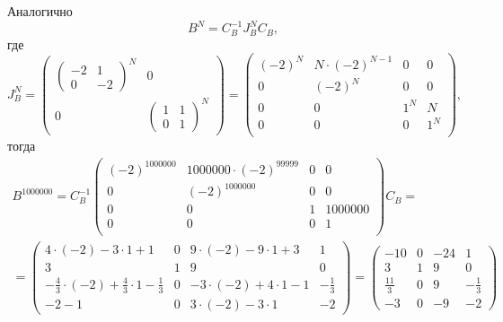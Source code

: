\documentclass[12pt]{article}
\begin{document}
    Аналогично
    \[
        B^N = C_B^{-1} J_B^N C_B ,
    \]
    где
    \[
        J_B^N
        = \begin{pmatrix}
              \begin{pmatrix}
                  -2 & 1  \\
                  0  & -2
              \end{pmatrix}^N & 0 \\
              0 & \begin{pmatrix}
                      1 & 1 \\
                      0 & 1
              \end{pmatrix}^N
        \end{pmatrix}
        =
        \begin{pmatrix}
        (-2)
            ^N & N \cdot (-2)^{N-1} & 0   & 0   \\
            0  & (-2)^N             & 0   & 0   \\
            0  & 0                  & 1^N & N   \\
            0  & 0                  & 0   & 1^N \\
        \end{pmatrix},
    \]
    тогда
    \begin{multline*}
        B^{1000000}
        = C_B^{-1}
        \begin{pmatrix}
        (-2)
            ^{1000000} & 1000000 \cdot (-2)^{99999} & 0 & 0       \\
            0          & (-2)^{1000000}             & 0 & 0       \\
            0          & 0                          & 1 & 1000000 \\
            0          & 0                          & 0 & 1       \\
        \end{pmatrix}
        C_B
        = \\
        = \begin{pmatrix}
              4 \cdot (-2) - 3 \cdot 1 + 1                                & 0 & 9 \cdot (-2) - 9 \cdot 1 + 3  & 1             \\
              3                                                           & 1 & 9                             & 0             \\
              -\frac{4}{3} \cdot (-2) + \frac{4}{3} \cdot 1 - \frac{1}{3} & 0 & -3 \cdot (-2) + 4 \cdot 1 - 1 & - \frac{1}{3} \\
              -2 - 1                                                      & 0 & 3 \cdot (-2) - 3 \cdot 1      & -2
        \end{pmatrix}
        =
        \begin{pmatrix}
            -10          & 0 & -24 & 1             \\
            3            & 1 & 9   & 0             \\
            \frac{11}{3} & 0 & 9   & - \frac{1}{3} \\
            -3           & 0 & -9  & -2
        \end{pmatrix}
    \end{multline*}
\end{document}
